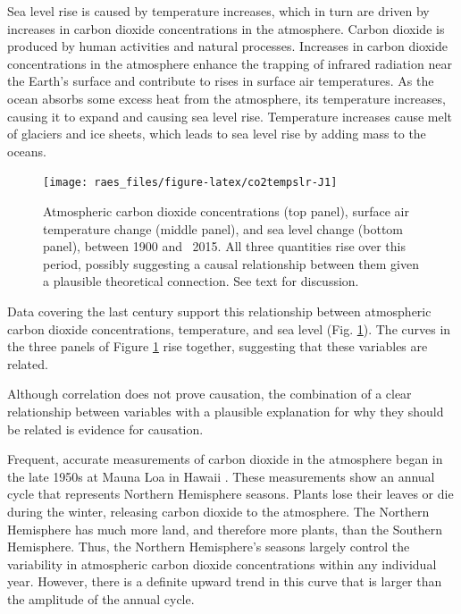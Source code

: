 \documentclass[
  11pt,
]{book}
\begin{document}
Sea level rise is caused by temperature increases, which in turn are driven by increases in carbon dioxide concentrations in the atmosphere. Carbon dioxide is produced by human activities and natural processes. Increases in carbon dioxide concentrations in the atmosphere enhance the trapping of infrared radiation near the Earth's surface and contribute to rises in surface air temperatures. As the ocean absorbs some excess heat from the atmosphere, its temperature increases, causing it to expand and causing sea level rise. Temperature increases cause melt of glaciers and ice sheets, which leads to sea level rise by adding mass to the oceans.

\begin{figure}

{\centering \texttt{[image: raes\_files/figure-latex/co2tempslr-J1]} 

}

\caption{Atmospheric carbon dioxide concentrations (top panel), surface air temperature change (middle panel), and sea level change (bottom panel), between 1900 and ~2015.  All three quantities rise over this period, possibly suggesting a causal relationship between them given a plausible theoretical connection. See text for discussion.}\label{fig:co2tempslr}
\end{figure}

Data covering the last century support this relationship between atmospheric carbon dioxide concentrations, temperature, and sea level (Fig. \ref{fig:co2tempslr}). The curves in the three panels of Figure \ref{fig:co2tempslr} rise together, suggesting that these variables are related.

\begin{center}

\begin{info}
Although correlation does not prove causation, the combination of a clear relationship between variables with a plausible explanation for why they should be related is evidence for causation.

\end{info}


\end{center}

Frequent, accurate measurements of carbon dioxide in the atmosphere began in the late 1950s at Mauna Loa in Hawaii \citep[blue curve in Fig. \ref{fig:co2tempslr}, top panel]{Keeling1976-bc}. These measurements show an annual cycle that represents Northern Hemisphere seasons. Plants lose their leaves or die during the winter, releasing carbon dioxide to the atmosphere. The Northern Hemisphere has much more land, and therefore more plants, than the Southern Hemisphere. Thus, the Northern Hemisphere's seasons largely control the variability in atmospheric carbon dioxide concentrations within any individual year. However, there is a definite upward trend in this curve that is larger than the amplitude of the annual cycle.
\end{document}

